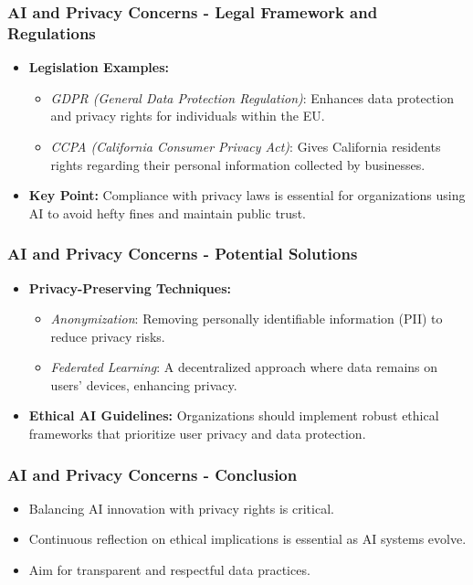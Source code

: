 \documentclass[aspectratio=169]{beamer}
\begin{document}
\begin{frame}[fragile]
    \frametitle{AI and Privacy Concerns - Legal Framework and Regulations}
    \begin{itemize}
        \item \textbf{Legislation Examples:}
        \begin{itemize}
            \item \textit{GDPR (General Data Protection Regulation)}: Enhances data protection and privacy rights for individuals within the EU.
            \item \textit{CCPA (California Consumer Privacy Act)}: Gives California residents rights regarding their personal information collected by businesses.
        \end{itemize}
        \item \textbf{Key Point:} Compliance with privacy laws is essential for organizations using AI to avoid hefty fines and maintain public trust.
    \end{itemize}
\end{frame}

\begin{frame}[fragile]
    \frametitle{AI and Privacy Concerns - Potential Solutions}
    \begin{itemize}
        \item \textbf{Privacy-Preserving Techniques:}
        \begin{itemize}
            \item \textit{Anonymization}: Removing personally identifiable information (PII) to reduce privacy risks.
            \item \textit{Federated Learning}: A decentralized approach where data remains on users' devices, enhancing privacy.
        \end{itemize}
        \item \textbf{Ethical AI Guidelines:} Organizations should implement robust ethical frameworks that prioritize user privacy and data protection.
    \end{itemize}
\end{frame}

\begin{frame}[fragile]
    \frametitle{AI and Privacy Concerns - Conclusion}
    \begin{itemize}
        \item Balancing AI innovation with privacy rights is critical.
        \item Continuous reflection on ethical implications is essential as AI systems evolve.
        \item Aim for transparent and respectful data practices.
    \end{itemize}
\end{frame}
\end{document}
